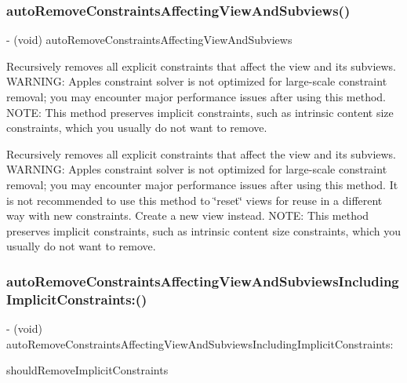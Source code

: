 \subsubsection{\texorpdfstring{auto\+Remove\+Constraints\+Affecting\+View\+And\+Subviews()}{autoRemoveConstraintsAffectingViewAndSubviews()}}
{\footnotesize\ttfamily -\/ (void) auto\+Remove\+Constraints\+Affecting\+View\+And\+Subviews \begin{DoxyParamCaption}{ }\end{DoxyParamCaption}}

Recursively removes all explicit constraints that affect the view and its subviews. W\+A\+R\+N\+I\+NG\+: Apple\textquotesingle{}s constraint solver is not optimized for large-\/scale constraint removal; you may encounter major performance issues after using this method. N\+O\+TE\+: This method preserves implicit constraints, such as intrinsic content size constraints, which you usually do not want to remove.

Recursively removes all explicit constraints that affect the view and its subviews. W\+A\+R\+N\+I\+NG\+: Apple\textquotesingle{}s constraint solver is not optimized for large-\/scale constraint removal; you may encounter major performance issues after using this method. It is not recommended to use this method to \char`\"{}reset\char`\"{} views for reuse in a different way with new constraints. Create a new view instead. N\+O\+TE\+: This method preserves implicit constraints, such as intrinsic content size constraints, which you usually do not want to remove. \mbox{\label{category_u_i_view_07_auto_layout_08_a29d693df00cbc559a033f68e90fc58f1}} 
\subsubsection{\texorpdfstring{auto\+Remove\+Constraints\+Affecting\+View\+And\+Subviews\+Including\+Implicit\+Constraints\+:()}{autoRemoveConstraintsAffectingViewAndSubviewsIncludingImplicitConstraints:()}}
{\footnotesize\ttfamily -\/ (void) auto\+Remove\+Constraints\+Affecting\+View\+And\+Subviews\+Including\+Implicit\+Constraints\+: \begin{DoxyParamCaption}\item[{(B\+O\+OL)}]{should\+Remove\+Implicit\+Constraints }\end{DoxyParamCaption}}

